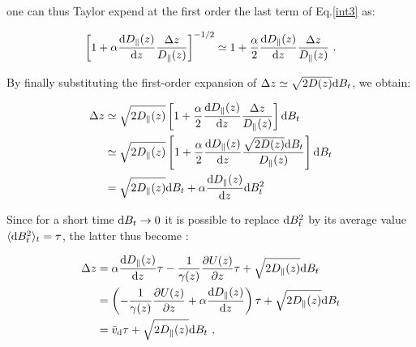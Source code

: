 one can thus Taylor expend at the first order the last term of Eq.\ref{int3} as:

\begin{equation}
	\left[1 + \alpha \frac{\textnormal{d} D_\parallel(z)}{\textnormal{d}z} \frac{\Delta z }{D_\parallel(z)}\right] ^{-1/2} \simeq 1 + \frac{\alpha }{2}\frac{\textnormal{d} D_\parallel(z)}{\textnormal{d}z} \frac{\Delta z }{D_\parallel(z)} ~.
\end{equation}

By finally substituting the first-order expansion of $\Delta z \simeq \sqrt{2D(z)} \textnormal{d}B_t$, we obtain:

\begin{equation}
	\begin{aligned}
		\Delta z & \simeq \sqrt{2D_\parallel (z)} \left[1 + \frac{\alpha }{2} \frac{\textnormal{d} D_\parallel(z)}{\textnormal{d}z} \frac{\Delta z }{D_\parallel(z)}\right]  \textnormal{d} B_t \\
		& \simeq \sqrt{2D_\parallel (z)} \left[1 + \frac{\alpha }{2} \frac{\textnormal{d} D_\parallel(z)}{\textnormal{d}z} \frac{\sqrt{2D(z)} \textnormal{d}B_t }{D_\parallel(z)}\right]  \textnormal{d} B_t \\
		& =  \sqrt{2D_\parallel (z)} \textnormal{d}B_t + \alpha  \frac{\textnormal{d} D_\parallel(z)}{\textnormal{d}z} \textnormal{d} B_t ^2
	\end{aligned}
\end{equation}



Since for a short time $\textnormal{d}B_t \rightarrow 0$ it is possible to replace $\textnormal{d}B_t ^2$ by its average value  $\langle \textnormal{d}B_t ^2 \rangle _t = \tau$, the latter thus become \cite{ikeda_stochastic_2014}: 

\begin{equation}
	\begin{aligned}
		\Delta z &=   \alpha  \frac{\textnormal{d} D_\parallel(z)}{\textnormal{d}z}  \tau - \frac{1}{\gamma(z)}\frac{\partial U(z)}{\partial z}  \tau + \sqrt{2D_\parallel (z)} \textnormal{d}B_t \\
		&=  \left( - \frac{1}{\gamma(z)}\frac{\partial U(z)}{\partial z} +  \alpha  \frac{\textnormal{d} D_\parallel(z)}{\textnormal{d}z} \right) \tau + \sqrt{2D_\parallel (z)} \textnormal{d}B_t \\
		&= \bar{v}_\textnormal{d}\tau  + \sqrt{2D_\parallel (z)} \textnormal{d}B_t ~,
	\end{aligned}
\end{equation}

